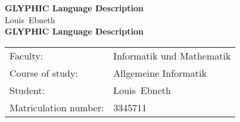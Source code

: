 \documentclass[fontsize=12pt,oneside]{report}
\newcommand*{\IhrVorname}{Louis}
\newcommand*{\IhrNachname}{Ebneth}
\newcommand*{\IhrStudiengang}{Allgemeine Informatik}
\newcommand*{\IhreMatrikelnummer}{3345711}
\newcommand*{\IhreFakultaet}{Informatik und Mathematik}
\newcommand*{\IhreArbeit}{GLYPHIC Language Description}	%
\newcommand*{\IhrTitelEN}{GLYPHIC Language Description}
\begin{document}
	\begin{titlepage}					%
		\thispagestyle{empty}
		\begin{figure}
   			\begin{minipage}[t]{0.48\linewidth}
        		\centering
   			\end{minipage}
   		\hfill
    		\begin{minipage}[t]{0.48\linewidth}
        		\centering
   			\end{minipage}
		\end{figure}
		\vspace*{2cm}
	    	\Huge
		\begin{flushleft}
		\textbf{\IhreArbeit} \\
		\large
		\IhrVorname \ \IhrNachname \\
		\vspace*{1.5cm}
		\Large
		\textbf{\IhrTitelEN} \\
		\vspace*{\fill}
	
		\normalsize
		\begin{tabular}{ll}
			Faculty: & \IhreFakultaet \\
  			Course of study: & \IhrStudiengang \\
            Student: & \IhrVorname \ \IhrNachname\\
  		    Matriculation number: & \IhreMatrikelnummer \\
  		\end{tabular}
		\end{flushleft}				
	\end{titlepage}
	\normalsize
	
	\newpage
	{
		\hypersetup{linkcolor=black}	%
		\tableofcontents
	}
	
	\newpage
		
		
\end{document}
